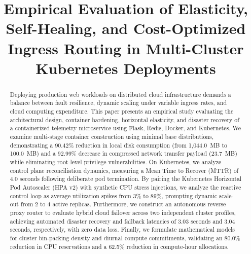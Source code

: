 \documentclass[conference]{IEEEtran}
\begin{document}

\title{Empirical Evaluation of Elasticity, Self-Healing, and Cost-Optimized Ingress Routing in Multi-Cluster Kubernetes Deployments}

\author{
}

\maketitle

\begin{abstract}
Deploying production web workloads on distributed cloud infrastructure demands a balance between fault resilience, dynamic scaling under variable ingress rates, and cloud computing expenditure. This paper presents an empirical study evaluating the architectural design, container hardening, horizontal elasticity, and disaster recovery of a containerized telemetry microservice using Flask, Redis, Docker, and Kubernetes. We examine multi-stage container construction using minimal base distributions, demonstrating a 90.42\% reduction in local disk consumption (from 1,044.0~MB to 100.0~MB) and a 92.99\% decrease in compressed network transfer payload (23.7~MB) while eliminating root-level privilege vulnerabilities. On Kubernetes, we analyze control plane reconciliation dynamics, measuring a Mean Time to Recover (MTTR) of 4.0 seconds following deliberate pod termination. By pairing the Kubernetes Horizontal Pod Autoscaler (HPA v2) with synthetic CPU stress injections, we analyze the reactive control loop as average utilization spikes from 3\% to 89\%, prompting dynamic scale-out from 2 to 4 active replicas. Furthermore, we construct an autonomous reverse proxy router to evaluate hybrid cloud failover across two independent cluster profiles, achieving automated disaster recovery and failback latencies of 3.03 seconds and 3.04 seconds, respectively, with zero data loss. Finally, we formulate mathematical models for cluster bin-packing density and diurnal compute commitments, validating an 80.0\% reduction in CPU reservations and a 62.5\% reduction in compute-hour allocations.
\end{abstract}
\end{document}
